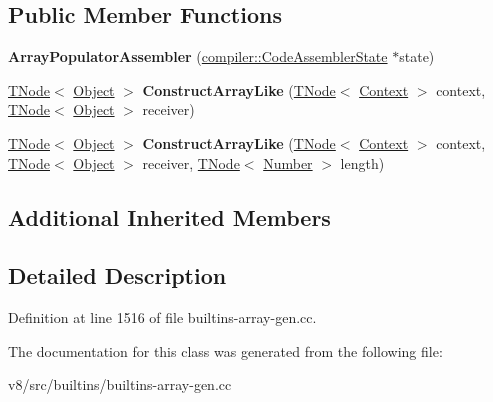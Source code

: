 \subsection*{Public Member Functions}
\begin{DoxyCompactItemize}
\item 
\mbox{\label{classv8_1_1internal_1_1ArrayPopulatorAssembler_ad1a0a6906c9bbd5ea03a7bcb8e5cee3c}} 
{\bfseries Array\+Populator\+Assembler} (\mbox{\hyperlink{classv8_1_1internal_1_1compiler_1_1CodeAssemblerState}{compiler\+::\+Code\+Assembler\+State}} $\ast$state)
\item 
\mbox{\label{classv8_1_1internal_1_1ArrayPopulatorAssembler_a71923bf04fa89b8a9c7697810a236e46}} 
\mbox{\hyperlink{classv8_1_1internal_1_1compiler_1_1TNode}{T\+Node}}$<$ \mbox{\hyperlink{classv8_1_1internal_1_1Object}{Object}} $>$ {\bfseries Construct\+Array\+Like} (\mbox{\hyperlink{classv8_1_1internal_1_1compiler_1_1TNode}{T\+Node}}$<$ \mbox{\hyperlink{classv8_1_1internal_1_1Context}{Context}} $>$ context, \mbox{\hyperlink{classv8_1_1internal_1_1compiler_1_1TNode}{T\+Node}}$<$ \mbox{\hyperlink{classv8_1_1internal_1_1Object}{Object}} $>$ receiver)
\item 
\mbox{\label{classv8_1_1internal_1_1ArrayPopulatorAssembler_a4ddd1f587f4d5ff62ded5cbfe8811d13}} 
\mbox{\hyperlink{classv8_1_1internal_1_1compiler_1_1TNode}{T\+Node}}$<$ \mbox{\hyperlink{classv8_1_1internal_1_1Object}{Object}} $>$ {\bfseries Construct\+Array\+Like} (\mbox{\hyperlink{classv8_1_1internal_1_1compiler_1_1TNode}{T\+Node}}$<$ \mbox{\hyperlink{classv8_1_1internal_1_1Context}{Context}} $>$ context, \mbox{\hyperlink{classv8_1_1internal_1_1compiler_1_1TNode}{T\+Node}}$<$ \mbox{\hyperlink{classv8_1_1internal_1_1Object}{Object}} $>$ receiver, \mbox{\hyperlink{classv8_1_1internal_1_1compiler_1_1TNode}{T\+Node}}$<$ \mbox{\hyperlink{structv8_1_1internal_1_1UnionT}{Number}} $>$ length)
\end{DoxyCompactItemize}
\subsection*{Additional Inherited Members}


\subsection{Detailed Description}


Definition at line 1516 of file builtins-\/array-\/gen.\+cc.



The documentation for this class was generated from the following file\+:\begin{DoxyCompactItemize}
\item 
v8/src/builtins/builtins-\/array-\/gen.\+cc\end{DoxyCompactItemize}
